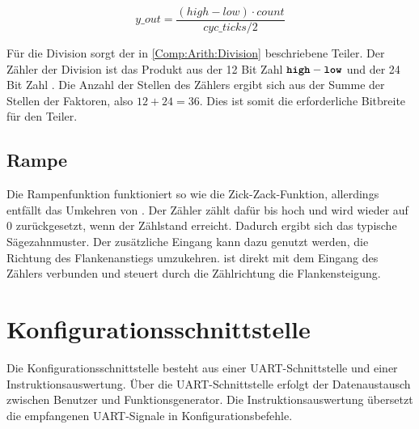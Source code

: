 $$ y\_out = \frac{(high - low) \cdot count}{cyc\_ticks / 2} $$

Für die Division sorgt der in \cref{Comp:Arith:Division} beschriebene Teiler.
Der Zähler der Division ist das Produkt aus der 12 Bit Zahl $\textbf{\texttt{high}} - \textbf{\texttt{low}}$ und der 24 Bit Zahl .
Die Anzahl der Stellen des Zählers ergibt sich aus der Summe der Stellen der Faktoren, also $12 + 24 = 36$.
Dies ist somit die erforderliche Bitbreite für den Teiler.

\subsection{Rampe} \label{Comp:Func:Ramp}
Die Rampenfunktion funktioniert so wie die Zick-Zack-Funktion, allerdings entfällt das Umkehren von .
Der Zähler zählt dafür bis  hoch und wird wieder auf 0 zurückgesetzt, wenn der Zählstand  erreicht.
Dadurch ergibt sich das typische Sägezahnmuster.
Der zusätzliche Eingang  kann dazu genutzt werden, die Richtung des Flankenanstiegs umzukehren.
 ist direkt mit dem Eingang  des Zählers verbunden und steuert durch die Zählrichtung die Flankensteigung.

\section{Konfigurationsschnittstelle} \label{Comp:Conf}
Die Konfigurationsschnittstelle besteht aus einer UART-Schnittstelle und einer Instruktionsauswertung.
Über die UART-Schnittstelle erfolgt der Datenaustausch zwischen Benutzer und Funktionsgenerator.
Die Instruktionsauswertung übersetzt die empfangenen UART-Signale in Konfigurationsbefehle.

